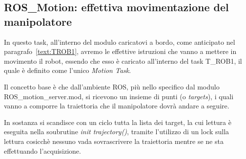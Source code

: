 \subsection{ROS\_Motion: effettiva movimentazione del manipolatore}
In questo task, all'interno del modulo caricatovi a bordo, come anticipato nel paragrafo~\vref{text:TROB1}, avremo le effettive istruzioni che vanno a mettere in movimento il robot, essendo che esso è caricato all'interno del task T\_ROB1, il quale è definito come l'unico \emph{Motion Task}. 

Il concetto base è che dall'ambiente ROS, più nello specifico dal modulo ROS\_motion\_server.mod, si ricevono un insieme di punti (o \emph{targets}), i quali vanno a comporre la traiettoria che il manipolatore dovrà andare a seguire.

In sostanza si scandisce con un ciclo tutta la lista dei target, la cui lettura è eseguita nella soubrutine \emph{init trajectory()}, tramite l'utilizzo di un lock sulla lettura cosicchè nessuno vada sovrascrivere la traiettoria mentre se ne sta effettuando l'acquisizione.
